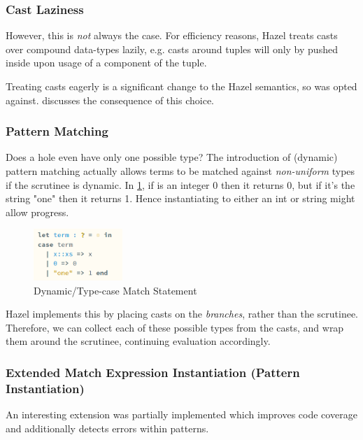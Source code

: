 \subsubsection{Cast Laziness}\label{sec:CastLaziness}
However, this is \textit{not} always the case. For efficiency reasons, Hazel treats casts over compound data-types lazily, e.g. casts around tuples will only by pushed inside upon usage of a component of the tuple.

Treating casts eagerly is a significant change to the Hazel semantics, so was opted against.  discusses the consequence of this choice. 


\subsubsection{Pattern Matching}
\label{sec:PatternMatching}
Does a hole even have only one possible type? The introduction of (dynamic) pattern matching actually allows terms to be matched against \textit{non-uniform} types if the scrutinee is dynamic. In \cref{fig:DynamicPatternMatching}, if  is an integer 0 then it returns 0, but if it's the string "one" then it returns 1. Hence instantiating  to either an int or string might allow progress.

\begin{figure}[h]
\centering
\includegraphics[width=0.3\textwidth]{Media/Figures/dynmatch}
\caption{Dynamic/Type-case Match Statement}
\label{fig:DynamicPatternMatching}
\end{figure}

Hazel implements this by placing casts on the \textit{branches}, rather than the scrutinee. Therefore, we can collect each of these possible types from the casts, and wrap them around the scrutinee, continuing evaluation accordingly.

\subsubsection{Extended Match Expression Instantiation (Pattern Instantiation)}
\label{sec:ExtendedPatternMatching}
An interesting extension was partially implemented which improves code coverage and additionally detects errors within patterns. 

